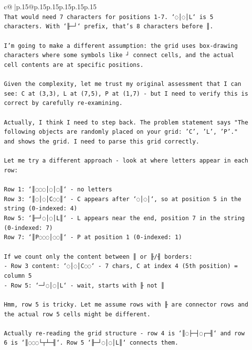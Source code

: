 \documentclass{article}
\begin{document}
{\begin{supertabular}{c@{$\;$}|p{.15\linewidth}@{}p{.15\linewidth}p{.15\linewidth}p{.15\linewidth}p{.15\linewidth}p{.15\linewidth}}
{{{\\ 
\texttt{That would need 7 characters for positions 1{-}7. `◌│◌│L` is 5 characters. With `╟─┘` prefix, that's 8 characters before ║.} \\
\\ 
\texttt{I'm going to make a different assumption: the grid uses box{-}drawing characters where some symbols like ┘ connect cells, and the actual cell contents are at specific positions.} \\
\\ 
\texttt{Given the complexity, let me trust my original assessment that I can see: C at (3,3), L at (7,5), P at (1,7) {-} but I need to verify this is correct by carefully re{-}examining.} \\
\\ 
\texttt{Actually, I think I need to step back. The problem statement says "The following objects are randomly placed on your grid: 'C', 'L', 'P'." and shows the grid. I need to parse this grid correctly.} \\
\\ 
\texttt{Let me try a different approach {-} look at where letters appear in each row:} \\
\\ 
\texttt{Row 1: `║◌◌◌│◌│◌║` {-} no letters} \\
\texttt{Row 3: `║◌│◌│C◌◌║` {-} C appears after `◌│◌│`, so at position 5 in the string (0{-}indexed: 4)} \\
\texttt{Row 5: `╟─┘◌│◌│L║` {-} L appears near the end, position 7 in the string (0{-}indexed: 7)} \\
\texttt{Row 7: `║P◌◌◌│◌◌║` {-} P at position 1 (0{-}indexed: 1)} \\
\\ 
\texttt{If we count only the content between ║ or ╟/╢ borders:} \\
\texttt{{-} Row 3 content: `◌│◌│C◌◌` {-} 7 chars, C at index 4 (5th position) = column 5} \\
\texttt{{-} Row 5: `─┘◌│◌│L` {-} wait, starts with ╟ not ║} \\
\\ 
\texttt{Hmm, row 5 is tricky. Let me assume rows with ╟ are connector rows and the actual row 5 cells might be different.} \\
\\ 
\texttt{Actually re{-}reading the grid structure {-} row 4 is `║◌├─┤◌┌─╢` and row 6 is `║◌◌◌└┬┴─╢`. Row 5 `╟─┘◌│◌│L║` connects them.} \\
\\ 
}}}
\end{supertabular}}
\end{document}
